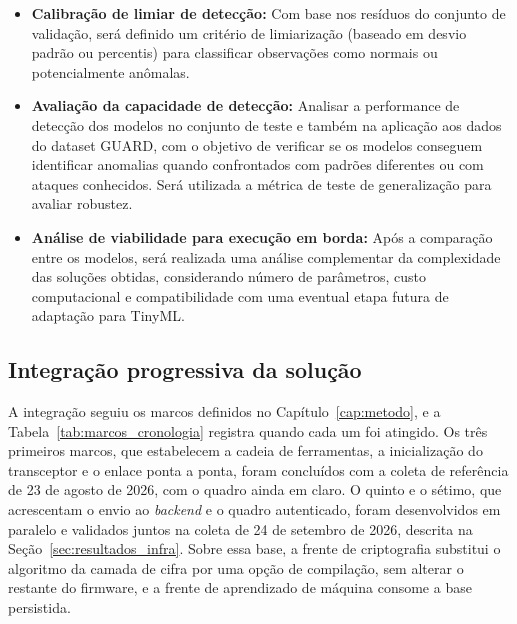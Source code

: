 \begin{itemize}
    \item \textbf{Calibração de limiar de detecção:} Com base nos resíduos do conjunto de validação, será definido um critério de limiarização (baseado em desvio padrão ou percentis) para classificar observações como normais ou potencialmente anômalas.

    \item \textbf{Avaliação da capacidade de detecção:} Analisar a performance de detecção dos modelos no conjunto de teste e também na aplicação aos dados do dataset GUARD, com o objetivo de verificar se os modelos conseguem identificar anomalias quando confrontados com padrões diferentes ou com ataques conhecidos. Será utilizada a métrica de teste de generalização para avaliar robustez.

    \item \textbf{Análise de viabilidade para execução em borda:} Após a comparação entre os modelos, será realizada uma análise complementar da complexidade das soluções obtidas, considerando número de parâmetros, custo computacional e compatibilidade com uma eventual etapa futura de adaptação para TinyML.
\end{itemize}


\subsection{Integração progressiva da solução}

A integração seguiu os marcos definidos no Capítulo~\ref{cap:metodo}, e a Tabela~\ref{tab:marcos_cronologia} registra quando cada um foi atingido. Os três primeiros marcos, que estabelecem a cadeia de ferramentas, a inicialização do transceptor e o enlace ponta a ponta, foram concluídos com a coleta de referência de 23 de agosto de 2026, com o quadro ainda em claro. O quinto e o sétimo, que acrescentam o envio ao \textit{backend} e o quadro autenticado, foram desenvolvidos em paralelo e validados juntos na coleta de 24 de setembro de 2026, descrita na Seção~\ref{sec:resultados_infra}. Sobre essa base, a frente de criptografia substitui o algoritmo da camada de cifra por uma opção de compilação, sem alterar o restante do firmware, e a frente de aprendizado de máquina consome a base persistida.

